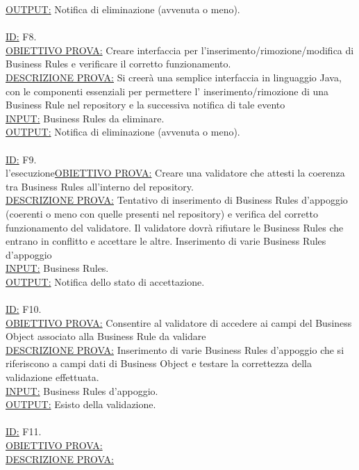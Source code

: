 \documentclass[11pt,titlepage,a4paper]{report}
\begin{document}
\underline{OUTPUT:} Notifica di eliminazione (avvenuta o meno).\\
\\
\underline{ID:} F8.\\
\underline{OBIETTIVO PROVA:} Creare interfaccia per l'inserimento/rimozione/modifica di Business Rules e verificare il corretto funzionamento. \\
\underline{DESCRIZIONE PROVA:} Si creer\`a  una semplice interfaccia in linguaggio Java, con le componenti essenziali per permettere l' inserimento/rimozione di una Business Rule nel repository e la successiva notifica di tale evento\\
\underline{INPUT:} Business Rules da eliminare.\\
\underline{OUTPUT:} Notifica di eliminazione (avvenuta o meno).\\
\\
\underline{ID:} F9.\\
l'esecuzione\underline{OBIETTIVO PROVA:} Creare una validatore che attesti la coerenza tra Business Rules all'interno del repository. \\
\underline{DESCRIZIONE PROVA:} Tentativo di inserimento di Business Rules d'appoggio (coerenti o meno con quelle presenti nel repository) e verifica del corretto funzionamento del validatore. Il validatore dovr\`a rifiutare le Business Rules che entrano in conflitto e accettare le altre. Inserimento di varie Business Rules d'appoggio\\
\underline{INPUT:} Business Rules. \\
\underline{OUTPUT:} Notifica dello stato di accettazione. \\
\\
\underline{ID:} F10.\\
\underline{OBIETTIVO PROVA:} Consentire al validatore di accedere ai campi del Business Object associato alla Business Rule da validare\\
\underline{DESCRIZIONE PROVA:} Inserimento di varie Business Rules d'appoggio che si riferiscono a campi dati di Business Object e testare la correttezza della validazione effettuata.\\
\underline{INPUT:} Business Rules d'appoggio. \\
\underline{OUTPUT:} Esisto della validazione. \\
\\
\underline{ID:} F11.\\
\underline{OBIETTIVO PROVA:} \\
\underline{DESCRIZIONE PROVA:}  \\
\end{document}
